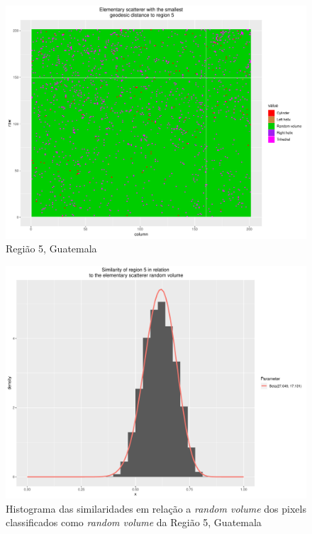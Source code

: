 \documentclass[12pt]{article}
\begin{document}
\begin{figure}[!h]
    \centering    
    \includegraphics[width = 0.77\linewidth]{../../Images/Report_18_12_20/Classifier_Geo_Dist/Class_Map/Guate/region5_predomain.pdf}
    \caption{Região 5, Guatemala}
    \label{fig:class_map_r5}
\end{figure}

\begin{figure}[!h]
    \centering   
    \includegraphics[width = 0.8\linewidth]{../../Images/Report_18_12_20/Classifier_Geo_Dist/Histograms/Guate/region5_rv_sm_filter.pdf}
    \caption{Histograma das similaridades em relação a \textit{random volume} dos pixels classificados como \textit{random volume} da Região 5, Guatemala}
    \label{fig:class_hist_r5_rv}
\end{figure}
\end{document}
